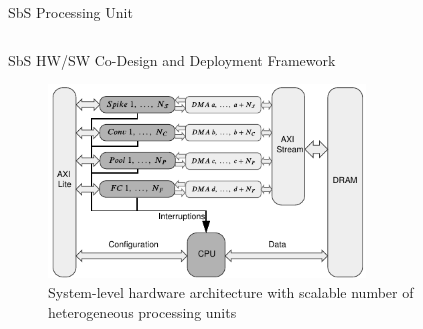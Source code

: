 \begin{frame}{SbS Processing Unit}
\begin{columns}[c]
	\end{columns}
\end{frame}


\begin{frame}{SbS HW/SW Co-Design and Deployment Framework}
	
	\begin{figure}
		\includegraphics[width=0.75\textwidth]{./slides/figures/sbs_hw.pdf} %
		\caption{System-level hardware architecture with scalable number of heterogeneous processing units}
	\end{figure}
	
\end{frame}

